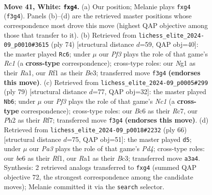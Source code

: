 \documentclass[11pt]{article}
\begin{document}
\clearpage

\begin{figure}[p]\centering
\begin{subfigure}{0.46\textwidth}\centering
\resizebox{\linewidth}{!}{%
\newchessgame
\chessboard[
  setfen={6r1/r7/p1B1bk2/Bn4p1/5pp1/PP3P2/1K5P/R4RN1 w - - 0 41},
  showmover=false,
  pgfstyle=straightmove, color=movearrow, markmove={f3-g4}
]}
\caption{}
\end{subfigure}\hfill
\begin{subfigure}{0.46\textwidth}\centering
\resizebox{\linewidth}{!}{%
\newchessgame
\chessboard[
  setfen={3r2k1/2r2pp1/3b2n1/p2PpB2/Pp3P2/4B1P1/6K1/R1R5 w - - 4 38},
  showmover=false,
  pgfstyle=straightmove, color=movearrow, markmove={c1-c6}
]}
\caption{}
\end{subfigure}
\\[4pt]
\begin{subfigure}{0.46\textwidth}\centering
\resizebox{\linewidth}{!}{%
\newchessgame
\chessboard[
  setfen={2n4k/p1r2r2/R1N2b1p/1P3Bp1/8/3R2P1/5P1P/6K1 b - - 0 40},
  showmover=false,
  pgfstyle=straightmove, color=movearrow, markmove={c8-b6}
]}
\caption{}
\end{subfigure}\hfill
\begin{subfigure}{0.46\textwidth}\centering
\resizebox{\linewidth}{!}{%
\newchessgame
\chessboard[
  setfen={3rk3/1pp1b3/2n4r/4P3/2RPBp1p/2B3p1/5P2/5RK1 w - - 0 34},
  showmover=false,
  pgfstyle=straightmove, color=movearrow, markmove={d4-d5}
]}
\caption{}
\end{subfigure}
\caption{\textbf{Move 41, White: \texttt{fxg4}.} (a) Our position; Melanie plays \texttt{fxg4} (\texttt{f3g4}). Panels (b)--(d) are the retrieved master positions whose correspondence most drove this move (highest QAP objective among those that transfer to it). (b) Retrieved from \texttt{lichess\_elite\_2024-09\_p0010\#3615} (ply 74) [structural distance $d$=59, QAP obj=40]: the master played \texttt{Rc6}; under $\mu$ our \emph{Pf3} plays the role of that game's \emph{Rc1} (a \textbf{cross-type} correspondence); cross-type roles: our \emph{N}g1 as their \emph{R}a1, our \emph{R}f1 as their \emph{B}e3; transferred move \texttt{f3g4} \textbf{(endorses this move)}. (c) Retrieved from \texttt{lichess\_elite\_2024-09\_p0005\#299} (ply 79) [structural distance $d$=77, QAP obj=32]: the master played \texttt{Nb6}; under $\mu$ our \emph{Pf3} plays the role of that game's \emph{Nc1} (a \textbf{cross-type} correspondence); cross-type roles: our \emph{B}c6 as their \emph{R}c7, our \emph{P}h2 as their \emph{R}f7; transferred move \texttt{f3g4} \textbf{(endorses this move)}. (d) Retrieved from \texttt{lichess\_elite\_2024-09\_p0018\#2232} (ply 66) [structural distance $d$=75, QAP obj=51]: the master played \texttt{d5}; under $\mu$ our \emph{Pa3} plays the role of that game's \emph{Pd4}; cross-type roles: our \emph{b}e6 as their \emph{R}f1, our \emph{R}a1 as their \emph{B}c3; transferred move \texttt{a3a4}. Synthesis: 2 retrieved analogs transferred to \texttt{fxg4} (summed QAP objective 72, the strongest correspondence among the candidate moves); Melanie committed it via the \texttt{search} selector.}
\label{fig:thought-m80}
\end{figure}
\end{document}
